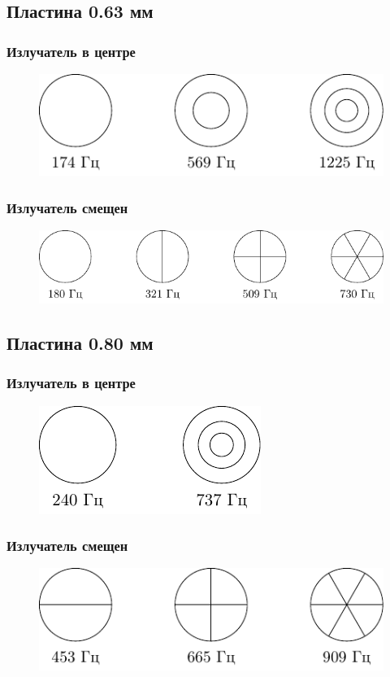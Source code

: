 \subsection{Пластина 0.63 мм}
\subsubsection{Излучатель в центре}
\begin{figure}[H]
	\centering
	\includegraphics[scale=1.5]{fig/63_c.pdf}
\end{figure}
\subsubsection{Излучатель смещен}
\begin{figure}[H]
	\centering
	\includegraphics[scale=1.5]{fig/63_b.pdf}
\end{figure}
\subsection{Пластина 0.80 мм}
\subsubsection{Излучатель в центре}
\begin{figure}[H]
	\centering
	\includegraphics[scale=1.5]{fig/80_c.pdf}
\end{figure}
\subsubsection{Излучатель смещен}
\begin{figure}[H]
	\centering
	\includegraphics[scale=1.5]{fig/80_b.pdf}
\end{figure}

